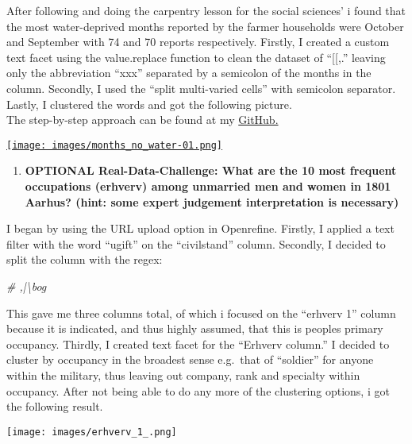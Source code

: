 \documentclass[
]{article}
\newenvironment{Shaded}{\begin{snugshade}}{\end{snugshade}}
\newcommand{\CommentTok}[1]{\textcolor[rgb]{0.56,0.35,0.01}{\textit{#1}}}
\providecommand{\tightlist}{%
  \setlength{\itemsep}{0pt}\setlength{\parskip}{0pt}}
\begin{document}
After following and doing the carpentry lesson for the social sciences'
i found that the most water-deprived months reported by the farmer
households were October and September with 74 and 70 reports
respectively. Firstly, I created a custom text facet using the
value.replace function to clean the dataset of ``{[}{[},.'' leaving only
the abbreviation ``xxx'' separated by a semicolon of the months in the
column. Secondly, I used the ``split multi-varied cells'' with semicolon
separator. Lastly, I clustered the words and got the following
picture.\\
The step-by-step approach can be found at my
\href{https://github.com/Emil3103/Digital-Methods/blob/main/Week_02/Scripts/danish_monarchs_openrefine}{GitHub.}

\href{https://github.com/Emil3103/Digital-Methods/blob/main/Week_02/Screenshots/months_no_water.png}{\texttt{[image: images/months\_no\_water-01.png]}}

\begin{enumerate}
\def\labelenumi{\arabic{enumi})}
\setcounter{enumi}{3}
\tightlist
\item
  \textbf{OPTIONAL Real-Data-Challenge: What are the 10 most frequent
  occupations (erhverv) among unmarried men and women in 1801 Aarhus?
  (hint: some expert judgement interpretation is necessary)}
\end{enumerate}

I began by using the URL upload option in Openrefine. Firstly, I applied
a text filter with the word ``ugift'' on the ``civilstand'' column.
Secondly, I decided to split the column with the regex:

\begin{Shaded}
\begin{Highlighting}[]
\CommentTok{\# ,|\textbackslash{}bog}
\end{Highlighting}
\end{Shaded}

This gave me three columns total, of which i focused on the ``erhverv
1'' column because it is indicated, and thus highly assumed, that this
is peoples primary occupancy. Thirdly, I created text facet for the
``Erhverv column.'' I decided to cluster by occupancy in the broadest
sense e.g.~that of ``soldier'' for anyone within the military, thus
leaving out company, rank and specialty within occupancy. After not
being able to do any more of the clustering options, i got the following
result.

\texttt{[image: images/erhverv\_1\_.png]}
\end{document}
